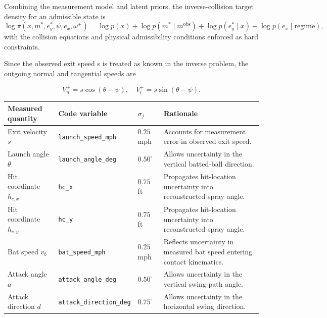 \documentclass[11pt]{article}
\begin{document}
Combining the measurement model and latent priors, the inverse-collision target density for an admissible state is
\[
\log \pi
\left(
x,m^{\ast},e_y^{\ast},\psi,e_x,\omega^{+}
\right)
=
\log p(x)
+
\log p(m^{\ast}\mid m^{\mathrm{obs}})
+
\log p(e_y^{\ast}\mid x)
+
\log p(e_x\mid \mathrm{regime}),
\]
with the collision equations and physical admissibility conditions enforced as hard constraints.


Since the observed exit speed s is treated as known in the inverse problem, the outgoing normal and tangential speeds are

\begin{equation}
V_n^+ = s \cos(\theta - \psi), \quad V_t^+ = s \sin(\theta - \psi).
\tag{10}
\end{equation}


\begin{table}[H]
\centering
\scriptsize
\begin{tabular}{llll}
\toprule
\textbf{Measured quantity} & \textbf{Code variable} & \textbf{$\sigma_j$} & \textbf{Rationale} \\
\midrule

Exit velocity $s$ &
\texttt{launch\_speed\_mph} &
$0.25$ mph &
Accounts for measurement error in observed exit speed. \\

Launch angle $\theta$ &
\texttt{launch\_angle\_deg} &
$0.50^\circ$ &
Allows uncertainty in the vertical batted-ball direction. \\

Hit coordinate $h_{c,x}$ &
\texttt{hc\_x} &
$0.75$ ft &
Propagates hit-location uncertainty into reconstructed spray angle. \\

Hit coordinate $h_{c,y}$ &
\texttt{hc\_y} &
$0.75$ ft &
Propagates hit-location uncertainty into reconstructed spray angle. \\

Bat speed $v_b$ &
\texttt{bat\_speed\_mph} &
$0.25$ mph &
Reflects uncertainty in measured bat speed entering contact kinematics. \\

Attack angle $a$ &
\texttt{attack\_angle\_deg} &
$0.50^\circ$ &
Allows uncertainty in the vertical swing-path angle. \\

Attack direction $d$ &
\texttt{attack\_direction\_deg} &
$0.75^\circ$ &
Allows uncertainty in the horizontal swing direction. \\


\end{tabular}
\end{table}
\end{document}

